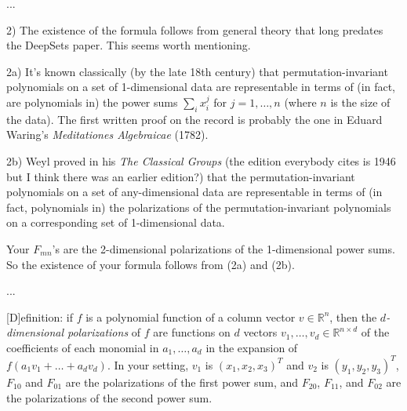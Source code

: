 \documentclass{article}
\begin{document}
...

2) The existence of the formula follows from general theory that long predates the DeepSets paper. This seems worth mentioning.

2a) It's known classically (by the late 18th century) that permutation-invariant polynomials on a set of 1-dimensional data are representable in terms of (in fact, are polynomials in) the power sums $\sum_i x_i^j$ for $j=1,\dots,n$ (where $n$ is the size of the data). The first written proof on the record is probably the one in Eduard Waring’s \textit{Meditationes Algebraicae} (1782).

2b) Weyl proved in his \textit{The Classical Groups} (the edition everybody cites is 1946 but I think there was an earlier edition?) that the permutation-invariant polynomials on a set of any-dimensional data are representable in terms of (in fact, polynomials in) the polarizations of the permutation-invariant polynomials on a corresponding set of 1-dimensional data. 

Your $F_{mn}$'s are the 2-dimensional polarizations of the 1-dimensional power sums. So the existence of your formula follows from (2a) and (2b).

...

[D]efinition: if $f$ is a polynomial function of a column vector $v\in \mathbb{R}^n$, then the \textit{$d$-dimensional polarizations} of $f$ are functions on $d$ vectors $v_1,\dots,v_d\in \mathbb{R}^{n\times d}$ of the coefficients of each monomial in $a_1,\dots,a_d$ in the expansion of $f(a_1v_1 + \dots + a_dv_d)$.
In your setting, $v_1$ is $(x_1,x_2,x_3)^T$ and $v_2$ is $(y_1,y_2,y_3)^T$, $F_{10}$ and $F_{01}$ are the polarizations of the first power sum, and $F_{20}$, $F_{11}$, and $F_{02}$ are the polarizations of the second power sum.
\end{document}
